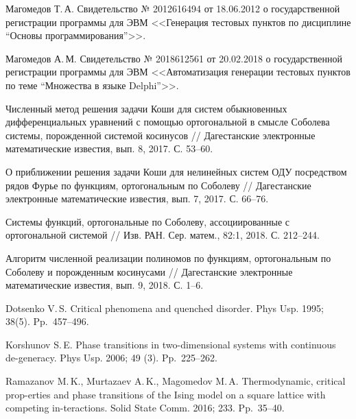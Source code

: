 \begin{thebibliography}{111}
Магомедов Т.\,А. Свидетельство № 2012616494 от 18.06.2012 о государственной регистрации программы для ЭВМ <<Генерация тестовых пунктов по дисциплине “Основы программирования”>>.

Магомедов А.\,М. Свидетельство № 2018612561 от 20.02.2018 о государственной регистрации программы для ЭВМ <<Автоматизация генерации тестовых пунктов по теме “Множества в языке Delphi”>>.






 Численный метод решения задачи Коши для систем обыкновенных дифференциальных уравнений с помощью ортогональной в смысле Соболева системы, порожденной системой косинусов // Дагестанские электронные математические известия, вып. 8, 2017. С. 53--60.

 О приближении решения задачи Коши для нелинейных систем ОДУ посредством рядов Фурье по функциям, ортогональным по Соболеву // Дагестанские электронные математические известия, вып. 7, 2017. С. 66--76.

 Системы функций, ортогональные по Соболеву, ассоциированные с ортогональной системой // Изв. РАН. Сер. матем., 82:1, 2018. С. 212--244.

 Алгоритм численной реализации полиномов по функциям, ортогональным по Соболеву и порожденным косинусами // Дагестанские электронные математические известия, вып. 9, 2018. С. 1--6.










Dotsenko V.\,S. Critical phenomena and quenched disorder.
Phys Usp. 1995; 38(5). Pp.~457--496.

Korshunov S.\,E. Phase transitions in two-dimensional systems with continuous de-generacy.
Phys Usp. 2006; 49 (3). Pp.~225–262.

Ramazanov M.\,K., Murtazaev A.\,K., Magomedov M.\,A.
Thermodynamic, critical prop-erties and phase transitions of the Ising model on a square lattice with competing in-teractions.
Solid State Comm. 2016; 233. Pp.~35--40.


\end{thebibliography}
